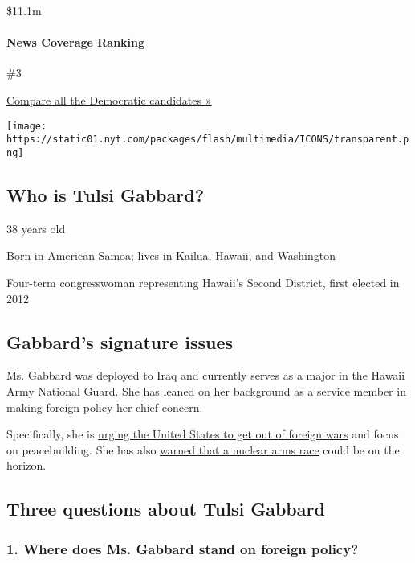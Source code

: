 \$11.1m

\hypertarget{news-coverage-ranking}{%
\paragraph{News Coverage Ranking}\label{news-coverage-ranking}}

\#3

\href{https://www.nytimes.com/interactive/2020/us/elections/democratic-polls.html}{Compare
all the Democratic candidates »}

\texttt{[image: https://static01.nyt.com/packages/flash/multimedia/ICONS/transparent.png]}

\hypertarget{who-is-tulsi-gabbard}{%
\subsection{Who is Tulsi Gabbard?}\label{who-is-tulsi-gabbard}}

38 years old

Born in American Samoa; lives in Kailua, Hawaii, and Washington

Four-term congresswoman representing Hawaii's Second District, first
elected in 2012

\hypertarget{gabbards-signature-issues}{%
\subsection{Gabbard's signature
issues}\label{gabbards-signature-issues}}

Ms. Gabbard was deployed to Iraq and currently serves as a major in the
Hawaii Army National Guard. She has leaned on her background as a
service member in making foreign policy her chief concern.

Specifically, she is
\href{https://www.nytimes.com/2019/08/02/us/politics/tulsi-gabbard-2020-presidential-race.html}{urging
the United States to get out of foreign wars} and focus on
peacebuilding. She has also
\href{https://www.nytimes.com/2019/06/26/us/politics/tulsi-gabbard-foreign-policy-war.html}{warned
that a nuclear arms race} could be on the horizon.

\hypertarget{three-questions-about-tulsi-gabbard}{%
\subsection{Three questions about Tulsi
Gabbard}\label{three-questions-about-tulsi-gabbard}}

\hypertarget{1-where-does-ms-gabbard-stand-on-foreign-policy}{%
\subsubsection{\texorpdfstring{\textbf{1. Where does Ms. Gabbard stand
on foreign
policy?}}{1. Where does Ms. Gabbard stand on foreign policy?}}\label{1-where-does-ms-gabbard-stand-on-foreign-policy}}

